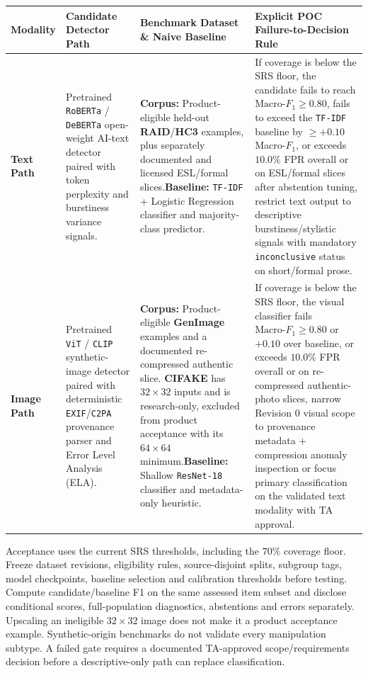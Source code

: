 \documentclass{article}
\begin{document}
\begin{tabularx}{\textwidth}{P{2.2cm} P{3.4cm} P{3.2cm} Y}
\caption{Concrete POC Detector Candidates, Baselines, Datasets, and Decision Rules} \label{TblPOCCandidates}\\
\toprule
\textbf{Modality} & \textbf{Candidate Detector Path} & \textbf{Benchmark Dataset \& Naive Baseline} & \textbf{Explicit POC Failure-to-Decision Rule}\\
\midrule
\textbf{Text Path} & Pretrained \texttt{RoBERTa} / \texttt{DeBERTa} open-weight AI-text detector paired with token perplexity and burstiness variance signals. & \textbf{Corpus:} Product-eligible held-out \textbf{RAID}/\textbf{HC3} examples, plus separately documented and licensed ESL/formal slices.\newline \textbf{Baseline:} \texttt{TF-IDF} + Logistic Regression classifier and majority-class predictor. & If coverage is below the SRS floor, the candidate fails to reach $\text{Macro-}F_1 \ge 0.80$, fails to exceed the \texttt{TF-IDF} baseline by $\ge +0.10$ Macro-$F_1$, or exceeds $10.0\%$ FPR overall or on ESL/formal slices after abstention tuning, restrict text output to descriptive burstiness/stylistic signals with mandatory \texttt{inconclusive} status on short/formal prose.\\
\addlinespace
\textbf{Image Path} & Pretrained \texttt{ViT} / \texttt{CLIP} synthetic-image detector paired with deterministic \texttt{EXIF}/\texttt{C2PA} provenance parser and Error Level Analysis (ELA). & \textbf{Corpus:} Product-eligible \textbf{GenImage} examples and a documented re-compressed authentic slice. \textbf{CIFAKE} has $32\times32$ inputs and is research-only, excluded from product acceptance with its $64\times64$ minimum.\newline \textbf{Baseline:} Shallow \texttt{ResNet-18} classifier and metadata-only heuristic. & If coverage is below the SRS floor, the visual classifier fails $\text{Macro-}F_1 \ge 0.80$ or $+0.10$ over baseline, or exceeds $10.0\%$ FPR overall or on re-compressed authentic-photo slices, narrow Revision 0 visual scope to provenance metadata + compression anomaly inspection or focus primary classification on the validated text modality with TA approval.\\
\bottomrule
\end{tabularx}

Acceptance uses the current SRS thresholds, including the $70\%$ coverage floor. Freeze dataset revisions, eligibility rules, source-disjoint splits, subgroup tags, model checkpoints, baseline selection and calibration thresholds before testing. Compute candidate/baseline F1 on the same assessed item subset and disclose conditional scores, full-population diagnostics, abstentions and errors separately. Upscaling an ineligible $32\times32$ image does not make it a product acceptance example. Synthetic-origin benchmarks do not validate every manipulation subtype. A failed gate requires a documented TA-approved scope/requirements decision before a descriptive-only path can replace classification.
\end{document}

